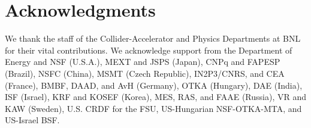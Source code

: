 \documentclass[dvipdfm]{elsart}
\begin{document}
\section*{Acknowledgments}   %

We thank the staff of the Collider-Accelerator and
Physics Departments at BNL for their vital contributions.
We acknowledge support from
the Department of Energy and NSF (U.S.A.),
MEXT and JSPS (Japan),
CNPq and FAPESP (Brazil),
NSFC (China),
MSMT (Czech Republic),
IN2P3/CNRS, and CEA (France),
BMBF, DAAD, and AvH (Germany),
OTKA (Hungary),
DAE (India),
ISF (Israel),
KRF and KOSEF (Korea),
MES, RAS, and FAAE (Russia),
VR and KAW (Sweden),
U.S. CRDF for the FSU,
US-Hungarian NSF-OTKA-MTA,
and US-Israel BSF.



%
\end{document}

